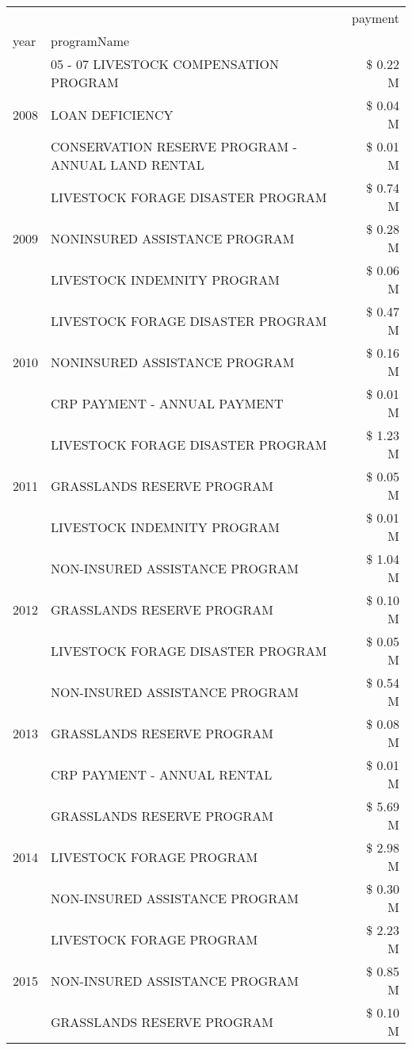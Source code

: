 \begin{tabular}{llr}
\toprule
 &  & payment \\
year & programName &  \\
\midrule
\multirow[t]{3}{*}{2008} & 05 - 07 LIVESTOCK COMPENSATION PROGRAM & \$ 0.22 M \\
 & LOAN DEFICIENCY & \$ 0.04 M \\
 & CONSERVATION RESERVE PROGRAM - ANNUAL LAND RENTAL & \$ 0.01 M \\
\cline{1-3}
\multirow[t]{3}{*}{2009} & LIVESTOCK FORAGE DISASTER  PROGRAM & \$ 0.74 M \\
 & NONINSURED ASSISTANCE PROGRAM & \$ 0.28 M \\
 & LIVESTOCK INDEMNITY PROGRAM & \$ 0.06 M \\
\cline{1-3}
\multirow[t]{3}{*}{2010} & LIVESTOCK FORAGE DISASTER  PROGRAM & \$ 0.47 M \\
 & NONINSURED ASSISTANCE PROGRAM & \$ 0.16 M \\
 & CRP PAYMENT - ANNUAL PAYMENT & \$ 0.01 M \\
\cline{1-3}
\multirow[t]{3}{*}{2011} & LIVESTOCK FORAGE DISASTER PROGRAM & \$ 1.23 M \\
 & GRASSLANDS RESERVE PROGRAM & \$ 0.05 M \\
 & LIVESTOCK INDEMNITY PROGRAM & \$ 0.01 M \\
\cline{1-3}
\multirow[t]{3}{*}{2012} & NON-INSURED ASSISTANCE PROGRAM & \$ 1.04 M \\
 & GRASSLANDS RESERVE PROGRAM & \$ 0.10 M \\
 & LIVESTOCK FORAGE DISASTER PROGRAM & \$ 0.05 M \\
\cline{1-3}
\multirow[t]{3}{*}{2013} & NON-INSURED ASSISTANCE PROGRAM & \$ 0.54 M \\
 & GRASSLANDS RESERVE PROGRAM & \$ 0.08 M \\
 & CRP PAYMENT - ANNUAL RENTAL & \$ 0.01 M \\
\cline{1-3}
\multirow[t]{3}{*}{2014} & GRASSLANDS RESERVE PROGRAM & \$ 5.69 M \\
 & LIVESTOCK FORAGE PROGRAM & \$ 2.98 M \\
 & NON-INSURED ASSISTANCE PROGRAM & \$ 0.30 M \\
\cline{1-3}
\multirow[t]{3}{*}{2015} & LIVESTOCK FORAGE PROGRAM & \$ 2.23 M \\
 & NON-INSURED ASSISTANCE PROGRAM & \$ 0.85 M \\
 & GRASSLANDS RESERVE PROGRAM & \$ 0.10 M \\
\cline{1-3}

\end{tabular}
